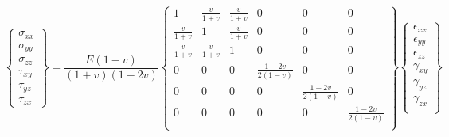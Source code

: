 \begin{equation}
    \begin{Bmatrix}
        \sigma_{xx} \\
        \sigma_{yy} \\
        \sigma_{zz} \\
        \tau_{xy}   \\
        \tau_{yz}   \\
        \tau_{zx}
    \end{Bmatrix} = \frac{E\left(1-v\right)}{\left(1+v\right)\left(1-2v\right)}
    \begin{Bmatrix}
        1             & \frac{v}{1+v} & \frac{v}{1+v} & 0                   & 0                   & 0                   \\
        \frac{v}{1+v} & 1             & \frac{v}{1+v} & 0                   & 0                   & 0                   \\
        \frac{v}{1+v} & \frac{v}{1+v} & 1             & 0                   & 0                   & 0                   \\
        0             & 0             & 0             & \frac{1-2v}{2(1-v)} & 0                   & 0                   \\
        0             & 0             & 0             & 0                   & \frac{1-2v}{2(1-v)} & 0                   \\
        0             & 0             & 0             & 0                   & 0                   & \frac{1-2v}{2(1-v)} \\
    \end{Bmatrix}
    \begin{Bmatrix}
        \epsilon_{xx} \\
        \epsilon_{yy} \\
        \epsilon_{zz} \\
        \gamma_{xy}   \\
        \gamma_{yz}   \\
        \gamma_{zx}   \\
    \end{Bmatrix}
\end{equation}

